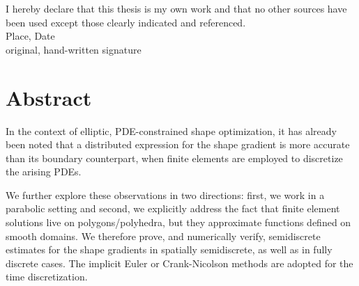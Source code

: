 \documentclass[english,a4paper,9pt,oneside]{scrbook}	%
\theoremstyle{break}
\theoremstyle{remark}
\begin{document}
\vspace*{23cm}
\noindent
I hereby declare that this thesis is my own work and that no other sources have been used except those clearly indicated and referenced.
\\[2cm]
Place, Date\\
original, hand-written signature
\newpage

%
%
%



\newpage
\section*{Abstract}
In the context of elliptic, PDE-constrained shape optimization, it has already been noted that a distributed expression for the shape gradient is more accurate than its boundary counterpart, when finite elements are employed to discretize the arising PDEs. 

We further explore these observations in two directions: first, we work in a parabolic setting and second, we explicitly address the fact that finite element solutions live on polygons/polyhedra, but they approximate functions defined on smooth domains. We therefore prove, and numerically verify, semidiscrete estimates for the shape gradients in spatially semidiscrete, as well as in fully discrete cases. The implicit Euler or Crank-Nicolson methods are adopted for the time discretization.

\end{document}
